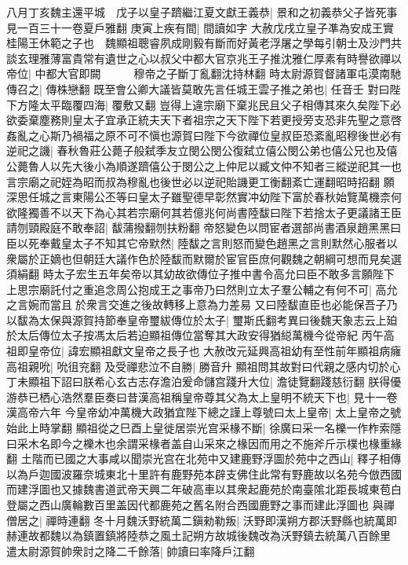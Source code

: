 八月丁亥魏主還平城　戊子以皇子躋繼江夏文獻王義恭|{
	景和之初義恭父子皆死事見一百三十一卷夏戶雅翻}
庚寅上疾有間|{
	間讀如字}
大赦戊戌立皇子凖為安成王實桂陽王休範之子也　魏顯祖聰睿夙成剛毅有斷而好黃老浮屠之學每引朝士及沙門共談玄理雅薄富貴常有遺世之心以叔父中都大官京兆王子推沈雅仁厚素有時譽欲禪以帝位|{
	中都大官即闕　　　穆帝之子斷丁亂翻沈持林翻}
時太尉源賀督諸軍屯漠南馳傳召之|{
	傳株戀翻}
既至會公卿大議皆莫敢先言任城王雲子推之弟也|{
	任音壬}
對曰陛下方隆太平臨覆四海|{
	覆敷又翻}
豈得上違宗廟下棄兆民且父子相傳其來久矣陛下必欲委棄塵務則皇太子宜承正統夫天下者祖宗之天下陛下若更授旁支恐非先聖之意啓姦亂之心斯乃禍福之原不可不愼也源賀曰陛下今欲禪位皇叔臣恐紊亂昭穆後世必有逆祀之譏|{
	春秋魯莊公薨子般弑季友立閔公閔公復弑立僖公閔公弟也僖公兄也及僖公薨魯人以先大後小為順遂躋僖公于閔公之上仲尼以臧文仲不知者三縱逆祀其一也言宗廟之祀姪為昭而叔為穆亂也後世必以逆祀貽譏更工衡翻紊亡運翻昭時招翻}
願深思任城之言東陽公丕等曰皇太子雖聖德早彰然實冲幼陛下富於春秋始覽萬機柰何欲隆獨善不以天下為心其若宗廟何其若億兆何尚書陸馛曰陛下若捨太子更議諸王臣請刎頸殿庭不敢奉詔|{
	馛蒲撥翻刎扶粉翻}
帝怒變色以問宦者選部尚書酒泉趙黑黑曰臣以死奉戴皇太子不知其它帝默然|{
	陸馛之言則怒而變色趙黑之言則默然心服者以衆屬於正嫡也但朝廷大議作色於陸馛而默爾於宦官臣庶何觀魏之朝綱可想而見矣選須絹翻}
時太子宏生五年矣帝以其幼故欲傳位子推中書令高允曰臣不敢多言願陛下上思宗廟託付之重追念周公抱成王之事帝乃曰然則立太子羣公輔之有何不可|{
	高允之言婉而當且於衆言交進之後故轉移上意為力差易}
又曰陸馛直臣也必能保吾子乃以馛為太保與源賀持節奉皇帝璽紱傳位於太子|{
	璽斯氏翻考異曰後魏天象志云上廹於太后傳位太子按馮太后若迫顯祖傳位當奪其大政安得猶縂萬機今從帝紀}
丙午高祖即皇帝位|{
	諱宏顯祖獻文皇帝之長子也}
大赦改元延興高祖幼有至性前年顯祖病癕高祖親吮|{
	吮徂兖翻}
及受禪悲泣不自勝|{
	勝音升}
顯祖問其故對曰代親之感内切於心丁未顯祖下詔曰朕希心玄古志存澹泊爰命儲宫踐升大位|{
	澹徒覽翻踐慈衍翻}
朕得優游恭已栖心浩然羣臣奏曰昔漢高祖稱皇帝尊其父為太上皇明不統天下也|{
	見十一卷漢高帝六年}
今皇帝幼冲萬機大政猶宜陛下總之謹上尊號曰太上皇帝|{
	太上皇帝之號始此上時掌翻}
顯祖從之巳酉上皇徙居崇光宫采椽不斷|{
	徐廣曰采一名櫟一作柞索隱曰采木名即今之櫟木也余謂采椽者盖自山采來之椽因而用之不施斧斤示樸也椽重緣翻}
土階而已國之大事咸以聞崇光宫在北苑中又建鹿野浮圖於苑中之西山|{
	釋子相傳以為戶迦國波羅奈城東北十里許有鹿野苑本辟支佛住此常有野鹿故以名苑今倣西國而建浮圖也又據魏書道武帝天興二年破高車以其衆起鹿苑於南臺隂北距長城東苞白登屬之西山廣輪數百里盖因代都鹿苑之舊名附合西國鹿野之事而建此浮圖也}
與禪僧居之|{
	禪時連翻}
冬十月魏沃野統萬二鎭勑勒叛|{
	沃野即漢朔方郡沃野縣也統萬即赫連故都魏以為鎮置鎮將陸恭之風土記朔方故城後魏改為沃野鎮去統萬八百餘里}
遣太尉源賀帥衆討之降二千餘落|{
	帥讀曰率降戶江翻}
